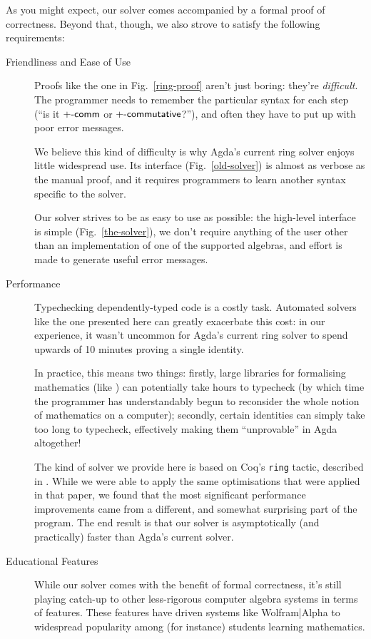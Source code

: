 \documentclass[acmsmall,review,anonymous]{acmart}\settopmatter{printfolios=true,printccs=false,printacmref=false}
\begin{document}
As you might expect, our solver comes accompanied by a formal proof of
correctness. Beyond that, though, we also strove to satisfy the following
requirements:
\begin{description}
  \item[Friendliness and Ease of Use] Proofs like the one in
    Fig.~\ref{ring-proof} aren't just boring: they're \emph{difficult}.
    The programmer needs to remember the particular syntax for each step (``is
    it \(\AgdaFunction{+-comm}\) or \(\AgdaFunction{+-commutative}\)?''), and
    often they have to put up with poor error messages.

    We believe this kind of difficulty is why Agda's current ring solver
    \cite{danielsson_agda_2018} enjoys little widespread use. Its interface
    (Fig.~\ref{old-solver}) is almost as verbose as the manual proof, and it
    requires programmers to learn another syntax specific to the solver.

    Our solver strives to be as easy to use as possible: the high-level
    interface is simple (Fig.~\ref{the-solver}), we don't require anything
    of the user other than an implementation of one of the supported algebras,
    and effort is made to generate useful error messages.
  \item[Performance] Typechecking dependently-typed code is a costly task.
    Automated solvers like the one presented here can greatly exacerbate this
    cost: in our experience, it wasn't uncommon for Agda's current ring solver
    to spend upwards of 10 minutes proving a single identity.

    In practice, this means two things: firstly, large libraries for formalising
    mathematics (like \citet{meshveliani_docon-provable_2018}) can potentially
    take hours to typecheck (by which time the programmer has understandably
    begun to reconsider the whole notion of mathematics on a computer);
    secondly, certain identities can simply take too long to typecheck,
    effectively making them ``unprovable'' in Agda altogether!

    The kind of solver we provide here is based on Coq's
    \cite{the_coq_development_team_2018_1219885} \verb+ring+ tactic, described
    in \citet{gregoire_proving_2005}. While we were able to apply the same
    optimisations that were applied in that paper, we found that the most
    significant performance improvements came from a different, and somewhat
    surprising part of the program. The end result is that our solver is
    asymptotically (and practically) faster than Agda's current solver.
  \item[Educational Features] While our solver comes with the benefit of formal
    correctness, it's still playing catch-up to other less-rigorous computer
    algebra systems in terms of features. These features have driven systems
    like Wolfram|Alpha \cite{wolfram_research_inc._wolframalpha_2019} to
    widespread popularity among (for instance) students learning mathematics.


\end{description}
\end{document}
